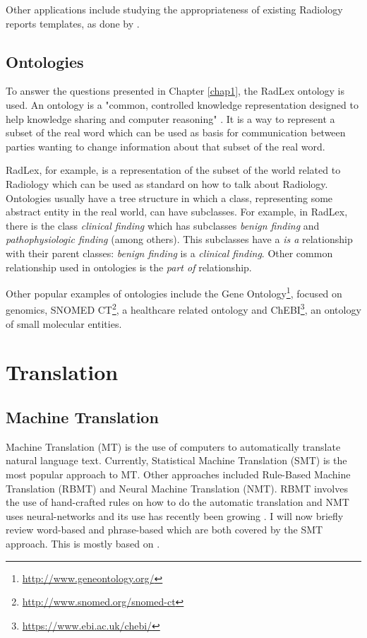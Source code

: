 Other applications include studying the appropriateness of existing Radiology reports templates, as done by \citep{Hong2013}.

\subsection{Ontologies}

To answer the questions presented in Chapter \ref{chap1}, the RadLex ontology is used. An ontology is a "common, controlled knowledge representation designed to help knowledge sharing and computer reasoning" \citep{Robinson2011}. It is a way to represent a subset of the real word  which can be used as basis for communication between parties wanting to change information about that subset of the real word.

RadLex, for example, is a representation of the subset of the world related to Radiology which can be used as standard on how to talk about Radiology. Ontologies usually have a tree structure in which a class, representing some abstract entity in the real world, can have subclasses. For example, in RadLex, there is the class \textit{clinical finding} which has subclasses \textit{benign finding} and \textit{pathophysiologic finding} (among others). This subclasses have a \textit{is a} relationship with their parent classes: \textit{benign finding} is a \textit{clinical finding}. Other common relationship used in ontologies is the \textit{part of} relationship.

Other popular examples of ontologies include the Gene Ontology\footnote{\url{http://www.geneontology.org/}}, focused on genomics, SNOMED CT\footnote{\url{http://www.snomed.org/snomed-ct}}, a healthcare related ontology and ChEBI\footnote{\url{https://www.ebi.ac.uk/chebi/}}, an ontology of small molecular entities.

\section{Translation}

\subsection{Machine Translation}

Machine Translation (MT) is the use of computers to automatically translate natural language text. Currently, Statistical Machine Translation (SMT) is the most popular approach to MT. Other approaches included Rule-Based Machine Translation (RBMT) and  Neural Machine Translation (NMT). RBMT involves the use of hand-crafted rules on how to do the automatic translation and NMT uses neural-networks and its use has recently been growing \citep{Bentivogli2016}. I will now briefly review word-based and phrase-based which are both covered by the SMT approach. This is mostly based on \citep{Koehn2010}.

